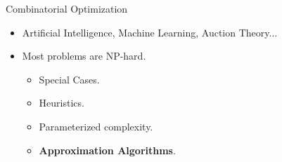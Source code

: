 \begin{frame}{Combinatorial Optimization}
\begin{itemize}[<+->]
  \item Artificial Intelligence, Machine Learning, Auction Theory...
  \item Most problems are NP-hard.
	\begin{itemize}[<+->]
	  \item Special Cases.
	  \item Heuristics.
	  \item Parameterized complexity.
	  \item \textbf{Approximation Algorithms}.
	\end{itemize}
\end{itemize}
\end{frame}